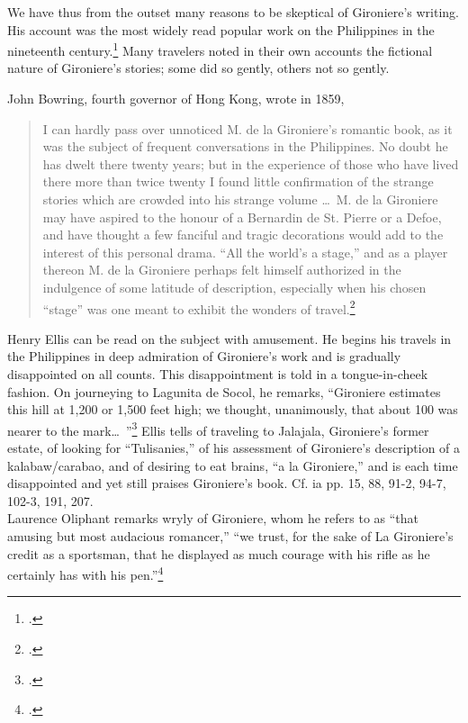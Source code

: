We have thus from the outset many reasons to be skeptical of Gironiere's writing. His account was the most widely read popular work on the Philippines in the nineteenth century.\footcite[56]{Sullivan1991} Many travelers noted in their own accounts the fictional nature of Gironiere's stories; some did so gently, others not so gently.

John Bowring, fourth governor of Hong Kong, wrote in 1859,
\begin{quote}
I can hardly pass over unnoticed M. de la Gironiere's romantic book, as it was the subject of frequent conversations in the Philippines. No doubt he has dwelt there twenty years; but in the experience of those who have lived there more than twice twenty I found little confirmation of the strange stories which are crowded into his strange volume \ldots\ M. de la Gironiere may have aspired to the honour of a Bernardin de St. Pierre or a Defoe, and have thought a few fanciful and tragic decorations would add to the interest of this personal drama. \enquote{All the world’s a stage,} and as a player thereon M. de la Gironiere perhaps felt himself authorized in the indulgence of some latitude of description, especially when his chosen \enquote{stage} was one meant to exhibit the wonders of travel.\footcite[101-2]{Bowring1859}
\end{quote}

Henry Ellis can be read on the subject with amusement. He begins his travels in the Philippines in deep admiration of Gironiere's work and is gradually disappointed on all counts. This disappointment is told in a tongue-in-cheek fashion. On journeying to Lagunita de Socol, he remarks, \enquote{Gironiere estimates this hill at 1,200 or 1,500 feet high; we thought, unanimously, that about 100 was nearer to the mark\ldots\ }\footcite[103]{Ellis1859} Ellis tells of traveling to Jalajala, Gironiere's former estate, of looking for \enquote{Tulisanies,}  of his assessment of Gironiere's description of a kalabaw/carabao, and of desiring to eat brains, \enquote{a la Gironiere,} and is each time disappointed and yet still praises Gironiere's book. Cf. ia pp. 15, 88, 91-2, 94-7, 102-3, 191, 207.\\
Laurence Oliphant remarks wryly of Gironiere, whom he refers to as \enquote{that amusing but most audacious romancer,} \enquote{we trust, for the sake of La Gironiere's credit as a sportsman, that he displayed as much courage with his rifle as he certainly has with his pen.}\footcite[88-9]{Oliphant1860}

